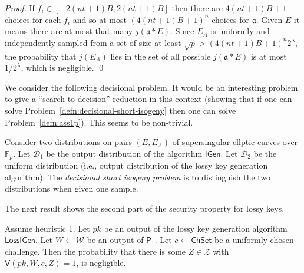 \documentclass{llncs}
\newcommand{\D}{\mathcal{D}}
\newcommand{\F}{\mathbb{F}}
\renewcommand{\a}{\mathfrak{a}}
\newcommand{\IGen}{\mathsf{IGen}}
\newcommand{\PP}{\mathsf{P}}
\newcommand{\VV}{\mathsf{V}}
\newcommand{\Wset}{\mathcal{W}}
\newcommand{\Zset}{\mathcal{Z}}
\newcommand{\ChSet}{\textsf{ChSet}}
\newcommand{\LossIGen}{\mathsf{LossIGen}}
\begin{document}
\begin{proof}
If $f_i \in [-2(nt+1)B,2(nt+1)B]$ then there are $4(nt+1)B + 1$ choices for each $f_i$ and so at most $(4 (nt+1)B + 1)^{n}$ choices for $\a$.
Given $E$ it means there are at most that many $j( \a * E )$. Since $E_A$ is uniformly and independently sampled from a set of size at least $\sqrt{p} > (4 (nt+1)B + 1)^{n} 2^\lambda$, the probability that $j(E_A)$ lies in the set of all possible $j( \a * E )$ is at most $1/2^\lambda$, which is negligible. \qed
\end{proof}


We consider the following decisional problem.
It would be an interesting problem to give a ``search to decision'' reduction in this context (showing that if one can solve Problem~\ref{defn:decisional-short-isogeny} then one can solve Problem~\ref{defn:ass1p}). This seems to be non-trivial.

\begin{problem} \label{defn:decisional-short-isogeny}
Consider two distributions on pairs $(E, E_A)$ of supersingular ellptic curves over $\F_p$.
Let $\D_1$ be the output distribution of the algorithm $\IGen$.
Let $\D_2$ be the uniform distribution (i.e., output distribution of the lossy key generation algorithm).
The \emph{decisional short isogeny problem} is to distinguish the two distributions when given one sample.
\end{problem}

The next result shows the second part of the security property for lossy keys.

\begin{lemma}
Assume heuristic 1.
Let $pk$ be an output of the lossy key generation algorithm $\LossIGen$.
Let $W \leftarrow \Wset$ be an output of $\PP_1$.
Let $c \leftarrow \ChSet$ be a uniformly chosen challenge.
Then the probability that there is some $Z \in \Zset$ with $\VV( pk, W, c, Z ) = 1$, is negligible.
\end{lemma}
\end{document}
